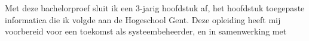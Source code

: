 
\chapter*{}%
\label{ch:voorwoord}


Met deze bachelorproef sluit ik een 3-jarig hoofdstuk af, het hoofdstuk 
toegepaste informatica die ik volgde aan de Hogeschool Gent. Deze opleiding 
heeft mij voorbereid voor een toekomst als systeembeheerder, en in samenwerking 
met 